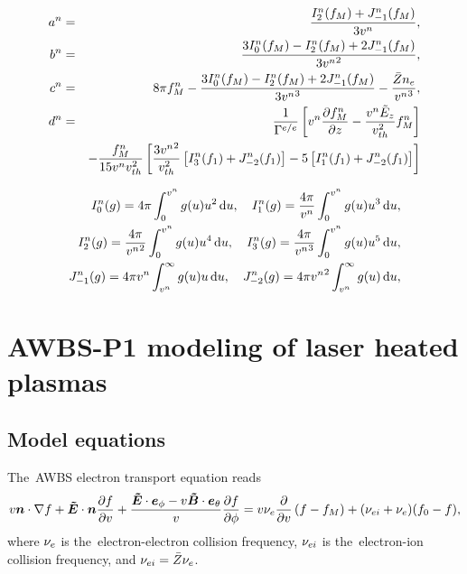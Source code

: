 \documentclass[preprint,12pt]{elsarticle}
\newcounter{bla}
\begin{document}
\begin{eqnarray}
  a^n &=& \frac{I^n_2(f_M) + J^n_{-1}(f_M)}{3v^n} ,
  \nonumber \\
  b^n &=& \frac{3 I^n_0(f_M) - I^n_2(f_M) + 2 J^n_{-1}(f_M)}{3{v^n}^2} ,
  \nonumber \\
  c^n &=& 8\pi f_M^n  - \frac{3 I^n_0(f_M) - I^n_2(f_M) + 2 J^n_{-1}(f_M)}
  {3{v^n}^3} - \frac{\bar{Z} n_e}{{v^n}^3},
  \nonumber \\
  d^n &=& \frac{1}{\Gamma^{e/e}}
  \left[v^n\frac{\partial{f_M^n}}{\partial{z}} - \frac{v^n\tilde{E}_z}{v_{th}^2}f_M^n\right]
  \nonumber \\
  &&- \frac{f_M^n}{15 v^nv_{th}^2} \left[\frac{3{v^n}^2}{v_{th}^2}
  \left[I^n_{3}(f_1) + J^n_{-2}(f_1)\right]
  - 5 \left[I^n_1(f_1) + J^n_{-2}(f_1)\right] \right]
  \nonumber
\end{eqnarray}

\begin{eqnarray}
  I^n_0(g) = 4\pi \int_0^{v^n} g(u) u^{2}
  \, \text{d} u ,\quad
  I^n_1(g) = \frac{4\pi}{v^n} \int_0^{v^n} g(u) u^{3}
  \, \text{d} u ,
  \nonumber \\
  I^n_2(g) = \frac{4\pi}{{v^n}^2} \int_0^{v^n} g(u) u^{4}
  \, \text{d} u ,\quad 
  I^n_3(g) = \frac{4\pi}{{v^n}^3} \int_0^{v^n} g(u) u^{5}
  \, \text{d} u ,
  \nonumber \\
  J^n_{-1}(g) = 4\pi v^n \int_{v^n}^\infty 
  g(u) u\, \text{d} u ,\quad
  J^n_{-2}(g) = 4\pi{v^n}^2 \int_{v^n}^\infty 
  g(u) \, \text{d} u ,
  \nonumber
\end{eqnarray}

\section{AWBS-P1 modeling of laser heated plasmas}\label{sec:OOE_AWBSP1}
\subsection{Model equations}
The~AWBS electron transport equation reads
\begin{multline}
  v\boldsymbol{n}\cdot\nabla f + \boldsymbol{\tilde{E}}\cdot\boldsymbol{n} \frac{\partial{f}}{\partial{v}} 
  + \frac{\boldsymbol{\tilde{E}}\cdot\boldsymbol{e}_\phi 
  - v\boldsymbol{\tilde{B}}\cdot\boldsymbol{e}_\theta}{v}\frac{\partial{f}}{\partial{\phi}}
  =
  v \nu_{e} \frac{\partial{}}{\partial{v}}\left(f - f_M\right) 
  + (\nu_{ei} + \nu_{e}) (f_0 - f) ,
  \nonumber \label{eq:AWBS_model}
\end{multline}
where $\nu_{e}$ is the~electron-electron collision frequency, 
$\nu_{ei}$ is the~electron-ion collision frequency, and $\nu_{ei} = \bar{Z} \nu_{e}$.
\end{document}
